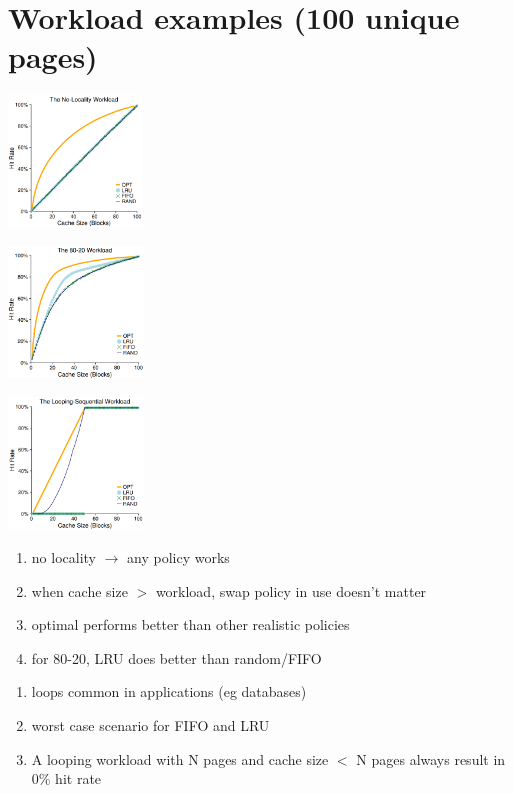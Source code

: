 \section*{Workload examples (100 unique pages)}
\begin{minipage}{0.33\linewidth}
  \includegraphics[width=\linewidth,height=3.5cm]{imgs/non_locality_workload}
\end{minipage}
\begin{minipage}{0.34\linewidth}
  \includegraphics[width=\linewidth,height=3.5cm]{imgs/eight_20_workload}
\end{minipage}
\begin{minipage}{0.33\linewidth}
  \includegraphics[width=\linewidth,height=3.5cm]{imgs/looping_workload}
\end{minipage}
\begin{minipage}{0.5\linewidth}
  \flushleft
  \begin{enumerate}
  \item no locality $\to$ any policy works
  \item when cache size $>$ workload, swap policy in use doesn't matter
  \item optimal performs better than other realistic policies
  \item for 80-20, LRU does better than random/FIFO
  \end{enumerate}
\end{minipage}
\begin{minipage}{0.5\linewidth}
  \flushleft
  \begin{enumerate}
  \item loops common in applications (eg databases)
  \item worst case scenario for FIFO and LRU
  \item A looping workload with N pages and cache size $<$ N pages always result in
0\% hit rate
  \end{enumerate}
\end{minipage}

